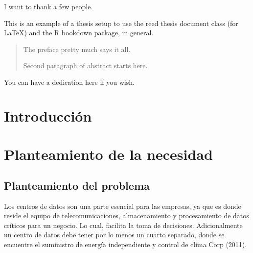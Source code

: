 \documentclass[12pt,twoside]{reedthesis}
\title{}
\author{}
\date{}
\begin{document}

\frontmatter %
\pagestyle{empty} %
  \begin{acknowledgements}
    I want to thank a few people.
  \end{acknowledgements}
  \begin{preface}
    This is an example of a thesis setup to use the reed thesis document class
    (for LaTeX) and the R bookdown package, in general.
  \end{preface}
  \hypersetup{linkcolor=black}
  \setcounter{tocdepth}{2}
  \tableofcontents

  \listoftables

  \listoffigures
  \begin{abstract}
    The preface pretty much says it all.
    
    \par
    
    Second paragraph of abstract starts here.
  \end{abstract}
  \begin{dedication}
    You can have a dedication here if you wish.
  \end{dedication}
\mainmatter %
\pagestyle{fancyplain} %

\hypertarget{introduccion}{%
\chapter*{Introducción}\label{introduccion}}

\hypertarget{rmd-basics}{%
\chapter{Planteamiento de la necesidad}\label{rmd-basics}}

\hypertarget{planteamiento-del-problema}{%
\section{Planteamiento del problema}\label{planteamiento-del-problema}}

Los centros de datos son una parte esencial para las empresas, ya que es donde reside el equipo de telecomunicaciones, almacenamiento y procesamiento de datos críticos para un negocio.
Lo cual, facilita la toma de decisiones.
Adicionalmente un centro de datos debe tener por lo menos un cuarto separado, donde se encuentre el suministro de energía independiente y control de clima Corp (2011).
\end{document}
